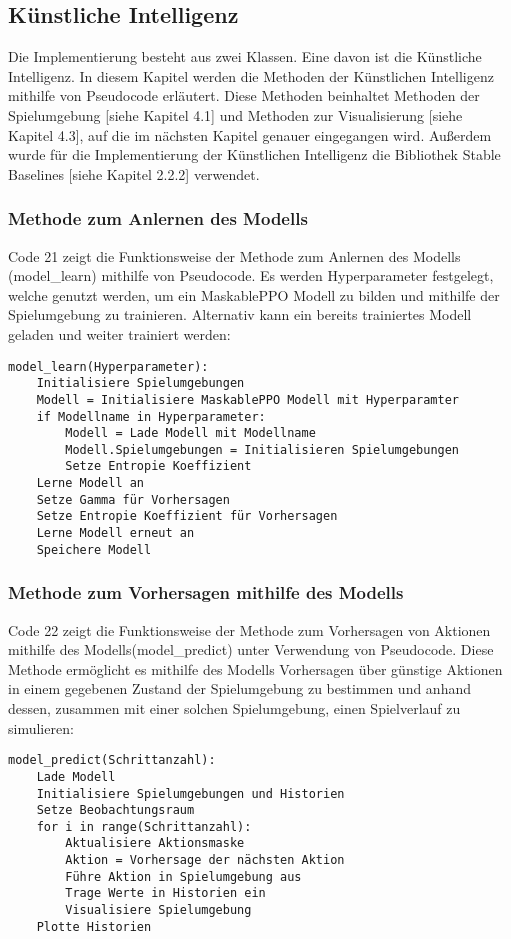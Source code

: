 \subsection{Künstliche Intelligenz}
Die Implementierung besteht aus zwei Klassen. Eine davon ist die Künstliche Intelligenz. In diesem Kapitel werden die Methoden der Künstlichen Intelligenz mithilfe von Pseudocode erläutert. Diese Methoden beinhaltet Methoden der Spielumgebung [siehe Kapitel 4.1] und Methoden zur Visualisierung [siehe Kapitel 4.3], auf die im nächsten Kapitel genauer eingegangen wird. Außerdem wurde für die Implementierung der Künstlichen Intelligenz die Bibliothek Stable Baselines [siehe Kapitel 2.2.2] verwendet.
\subsubsection{Methode zum Anlernen des Modells}
\begin{minipage}{\linewidth}
Code 21 zeigt die Funktionsweise der Methode zum Anlernen des Modells (model\_learn) mithilfe von Pseudocode. Es werden Hyperparameter festgelegt, welche genutzt werden, um ein MaskablePPO Modell zu bilden und mithilfe der Spielumgebung zu trainieren. Alternativ kann ein bereits trainiertes Modell geladen und weiter trainiert werden:
\vspace{0.5cm}
\begin{lstlisting}[caption={Methode zu Anlernen des Modells}]
model_learn(Hyperparameter):
	Initialisiere Spielumgebungen
	Modell = Initialisiere MaskablePPO Modell mit Hyperparamter
	if Modellname in Hyperparameter:
		Modell = Lade Modell mit Modellname
		Modell.Spielumgebungen = Initialisieren Spielumgebungen
		Setze Entropie Koeffizient
	Lerne Modell an
	Setze Gamma für Vorhersagen
	Setze Entropie Koeffizient für Vorhersagen
	Lerne Modell erneut an
	Speichere Modell
\end{lstlisting}
\end{minipage}
\subsubsection{Methode zum Vorhersagen mithilfe des Modells}
\begin{minipage}{\linewidth}
Code 22 zeigt die Funktionsweise der Methode zum Vorhersagen von Aktionen mithilfe des Modells(model\_predict) unter Verwendung von Pseudocode. Diese Methode ermöglicht es mithilfe des Modells Vorhersagen über günstige Aktionen in einem gegebenen Zustand der Spielumgebung zu bestimmen und anhand dessen, zusammen mit einer solchen Spielumgebung, einen Spielverlauf zu simulieren:
\vspace{0.5cm}
\begin{lstlisting}[caption={Methode zum Vorhersagen von Aktionen mithilfe des Modells}]
model_predict(Schrittanzahl):
	Lade Modell
	Initialisiere Spielumgebungen und Historien
	Setze Beobachtungsraum
	for i in range(Schrittanzahl):
		Aktualisiere Aktionsmaske
		Aktion = Vorhersage der nächsten Aktion
		Führe Aktion in Spielumgebung aus
		Trage Werte in Historien ein
		Visualisiere Spielumgebung
	Plotte Historien
\end{lstlisting}
\end{minipage}
